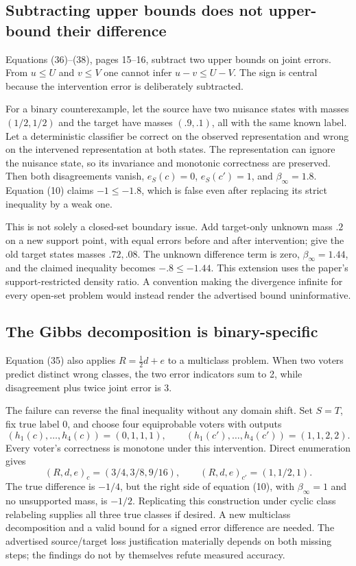 \documentclass[10pt]{article}
\begin{document}
\subsection*{Subtracting upper bounds does not upper-bound their difference}
Equations (36)–(38), pages 15–16, subtract two upper bounds on joint errors. From \(u\le U\) and \(v\le V\) one cannot infer \(u-v\le U-V\). The sign is central because the intervention error is deliberately subtracted.\par
For a binary counterexample, let the source have two nuisance states with masses \((1/2,1/2)\) and the target have masses \((.9,.1)\), all with the same known label. Let a deterministic classifier be correct on the observed representation and wrong on the intervened representation at both states. The representation can ignore the nuisance state, so its invariance and monotonic correctness are preserved. Then both disagreements vanish, \(e_S(c)=0\), \(e_S(c')=1\), and \(\beta_\infty=1.8\). Equation (10) claims \(-1\le-1.8\), which is false even after replacing its strict inequality by a weak one.\par
This is not solely a closed-set boundary issue. Add target-only unknown mass \(.2\) on a new support point, with equal errors before and after intervention; give the old target states masses \(.72,.08\). The unknown difference term is zero, \(\beta_\infty=1.44\), and the claimed inequality becomes \(-.8\le-1.44\). This extension uses the paper’s support-restricted density ratio. A convention making the divergence infinite for every open-set problem would instead render the advertised bound uninformative.\par
\subsection*{The Gibbs decomposition is binary-specific}
Equation (35) also applies \(R=\tfrac12d+e\) to a multiclass problem. When two voters predict distinct wrong classes, the two error indicators sum to 2, while disagreement plus twice joint error is 3.\par
The failure can reverse the final inequality without any domain shift. Set \(S=T\), fix true label 0, and choose four equiprobable voters with outputs \[(h_1(c),\ldots,h_4(c))=(0,1,1,1),\qquad
 (h_1(c'),\ldots,h_4(c'))=(1,1,2,2).\] Every voter’s correctness is monotone under this intervention. Direct enumeration gives \[(R,d,e)_c=(3/4,3/8,9/16),\qquad
 (R,d,e)_{c'}=(1,1/2,1).\] The true difference is \(-1/4\), but the right side of equation (10), with \(\beta_\infty=1\) and no unsupported mass, is \(-1/2\). Replicating this construction under cyclic class relabeling supplies all three true classes if desired. A new multiclass decomposition and a valid bound for a signed error difference are needed. The advertised source/target loss justification materially depends on both missing steps; the findings do not by themselves refute measured accuracy.\par
\end{document}
